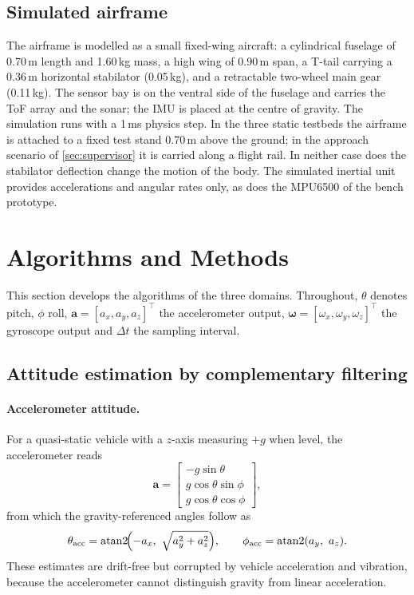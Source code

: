 \documentclass[11pt,a4paper]{article}
\newcommand{\vect}[1]{\bm{#1}}
\begin{document}
\subsection{Simulated airframe}
The airframe is modelled as a small fixed-wing aircraft: a cylindrical fuselage of 0.70\,m length and 1.60\,kg mass, a high wing of 0.90\,m span, a T-tail carrying a 0.36\,m horizontal stabilator (0.05\,kg), and a retractable two-wheel main gear (0.11\,kg). The sensor bay is on the ventral side of the fuselage and carries the ToF array and the sonar; the IMU is placed at the centre of gravity. The simulation runs with a 1\,ms physics step. In the three static testbeds the airframe is attached to a fixed test stand 0.70\,m above the ground; in the approach scenario of \cref{sec:supervisor} it is carried along a flight rail. In neither case does the stabilator deflection change the motion of the body. The simulated inertial unit provides accelerations and angular rates only, as does the MPU6500 of the bench prototype.
 
\section{Algorithms and Methods}\label{sec:algorithms}
This section develops the algorithms of the three domains. Throughout, $\theta$ denotes pitch, $\phi$ roll, $\vect a=[a_x,a_y,a_z]^\top$ the accelerometer output, $\vect\omega=[\omega_x,\omega_y,\omega_z]^\top$ the gyroscope output and $\Delta t$ the sampling interval.
 
\subsection{Attitude estimation by complementary filtering}\label{sec:attitude}
\paragraph{Accelerometer attitude.} For a quasi-static vehicle with a $z$-axis measuring $+g$ when level, the accelerometer reads
\begin{equation}
\vect a=\begin{bmatrix}-g\sin\theta\\ g\cos\theta\sin\phi\\ g\cos\theta\cos\phi\end{bmatrix},
\end{equation}
from which the gravity-referenced angles follow as
\begin{equation}
\theta_{\mathrm{acc}}=\operatorname{atan2}\!\Bigl(-a_x,\ \sqrt{a_y^2+a_z^2}\Bigr),\qquad
\phi_{\mathrm{acc}}=\operatorname{atan2}(a_y,\ a_z).
\label{eq:accangles}
\end{equation}
These estimates are drift-free but corrupted by vehicle acceleration and vibration, because the accelerometer cannot distinguish gravity from linear acceleration.
 
\end{document}
